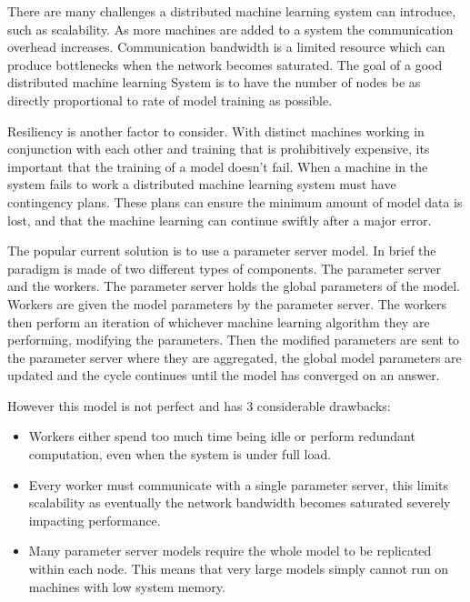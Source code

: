 There are many challenges a distributed machine learning system can introduce,
such as scalability. As more machines are added to a system the communication
overhead increases. Communication bandwidth is a limited resource which can
produce bottlenecks when the network becomes saturated. The goal of a good
distributed machine learning System is to have the number of nodes be as
directly proportional to rate of model training as possible.
\par

Resiliency is another factor to consider. With distinct machines working in
conjunction with each other and training that is prohibitively expensive, its
important that the training of a model doesn't fail. When a machine in the
system fails to work a distributed machine learning system must have contingency
plans. These plans can ensure the minimum amount of model data is lost, and that
the machine learning can continue swiftly after a major error.
\par


The popular current solution is to use a parameter server model. In brief the
paradigm is made of two different types of components. The parameter server and
the workers. The parameter server holds the global parameters of the model.
Workers are given the model parameters by the parameter server. The workers then
perform an iteration of whichever machine learning algorithm they are
performing, modifying the parameters. Then the modified parameters are sent to
the parameter server where they are aggregated, the global model parameters are
updated and the cycle continues until the model has converged on an answer.
\par

However this model is not perfect and has 3 considerable drawbacks:
\begin{itemize}
    \item Workers either spend too much time being idle or perform redundant
    computation, even when the system is under full load.
    \cite{googlemapreduce2008}
    \item Every worker must communicate with a single parameter server, this
    limits scalability as eventually the network bandwidth becomes saturated
    severely impacting performance. \cite{LI2014ParameterServers}
    \item Many parameter server models require the whole model to be replicated
    within each node. \cite{jia2018BeyondData} This means that very large models
    simply cannot run on machines with low system memory.  
\end{itemize}


